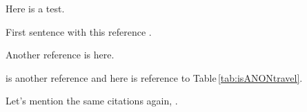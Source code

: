 \documentclass{CORE-AAS/aastex631}
\begin{document}
Here is a test. 

First sentence with this reference \citep{biviano+2021aap650_105}. 

Another reference is \citep{bressan+1994apj94_63} here.

\citet{anantharamaiah+1996apj466_13} is another reference and here is reference to Table\,\ref{tab:isANONtravel}.





Let's mention the same citations again, \citet[e.g.]{bressan+1994apj94_63, biviano+2021aap650_105}. 

%

\end{document}
